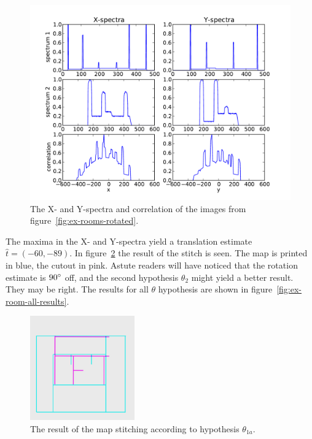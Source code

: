 \begin{figure}[ht]
	\centering
	\includegraphics[width=\textwidth]{images/stitching/rooms-ex-xy-corr.pdf}
	\caption{The X- and Y-spectra and correlation of the images from figure~\ref{fig:ex-rooms-rotated}.}
	\label{fig:ex-rooms-spectra}
\end{figure}

The maxima in the X- and Y-spectra yield a translation estimate $\hat t = (-60, -89)$. In figure~\ref{fig:ex-rooms-result} the result of the stitch is seen. The map is printed in blue, the cutout in pink. Astute readers will have noticed that the rotation estimate is $90\degree$ off, and the second hypothesis $\theta_{2}$ might yield a better result. They may be right. The results for all $\theta$ hypothesis are shown in figure~\ref{fig:ex-room-all-results}.

\begin{figure}[ht]
	\centering
	\includegraphics[width=0.4\textwidth]{images/stitching/rooms-ex-result-1a.png}
	\caption{The result of the map stitching according to hypothesis $\theta_{1a}$.}
	\label{fig:ex-rooms-result}
\end{figure}


